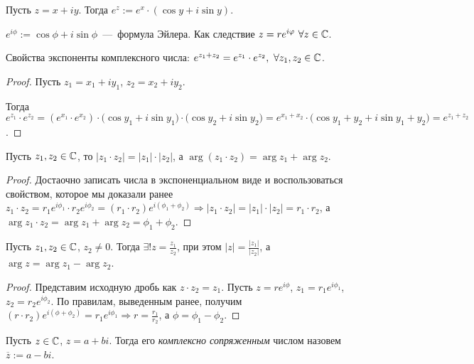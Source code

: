 \begin{definition}
    Пусть $z = x + iy$. Тогда $e^{z} := e^{x} \cdot (\cos{y} + i \sin{y})$.
\end{definition}
\begin{corollary}
    $e^{i \phi} := \cos{\phi} + i \sin{\phi}$~---~формула Эйлера. Как следствие $z = r e^{i \varphi} \  \forall z \in \mathbb{C}$.
\end{corollary}

Свойства экспоненты комплексного числа:
$e^{z_{1} + z_{2}} = e^{z_{1}} \cdot e^{z_{2}}, \  \forall z_{1}, z_{2} \in \mathbb{C}$.
\begin{proof}
    Пусть $z_{1} = x_{1} + i y_{1}$, $z_{2} = x_{2} + i y_{2}$.
    
    Тогда $e^{z_{1}} \cdot e^{z_{2}} = (e^{x_{1}} \cdot e^{x_{2}}) \cdot \big( \cos{y_{1}} + i \sin{y_{1}} \big) \cdot \big( \cos{y_{2}} + i \sin{y_{2}} \big) = e^{x_{1} + x_{2}} \cdot \big( \cos{y_{1} + y_{2}} + i \sin{y_{1} + y_{2}} \big) = e^{z_{1} + z_{2}}$.
\end{proof}
\begin{corollary}
    Пусть $z_{1}, z_{2} \in \mathbb{C}$, то $|z_{1} \cdot z_{2}| = |z_{1}| \cdot |z_{2}|$, а $\arg{(z_{1} \cdot z_{2})} = \arg{z_{1}} + \arg{z_{2}}$.
\end{corollary}
\begin{proof}
    Достаочно записать числа в экспоненциальном виде и воспользоваться свойством, которое мы доказали ранее $z_{1} \cdot z_{2} = r_{1} e^{i \phi_{1}} \cdot r_{2} e^{i \phi_{2}} = (r_{1} \cdot r_{2}) e^{i (\phi_{1} + \phi_{2})} \Rightarrow |z_{1} \cdot z_{2}| = |z_{1}| \cdot |z_{2}| = r_{1} \cdot r_{2}$, а $\arg{z_{1} \cdot z_{2}} = \arg{z_{1}} + \arg{z_{2}} = \phi_{1} + \phi_{2}$.
\end{proof}
\begin{corollary}
    Пусть $z_{1}, z_{2} \in \mathbb{C}$, $z_{2} \neq 0$. Тогда $\displaystyle \exists! z = \frac{z_{1}}{z_{2}}$, при этом $\displaystyle |z| = \frac{|z_{1}|}{|z_{2}|}$, а $\arg{z} = \arg{z_{1}} - \arg{z_{2}}$.
\end{corollary}
\begin{proof}
    Представим исходную дробь как $z \cdot z_{2} = z_{1}$. Пусть $z = r e^{i \phi}$, $z_{1} = r_{1} e^{i \phi_{1}}$, $z_{2} = r_{2} e^{i \phi_{2}}$. По правилам, выведенным ранее, получим $(r \cdot r_{2}) e^{i (\phi + \phi_{2})} = r_{1} e^{i \phi_{1}} \Rightarrow r = \frac{r_{1}}{r_{2}}$, а $\phi = \phi_{1} - \phi_{2}$.
\end{proof}
\begin{definition}
    Пусть $z \in \mathbb{C}$, $z = a + bi$. Тогда его \textit{комплексно сопряженным} числом назовем $\overline{z} := a - bi$.
\end{definition}
